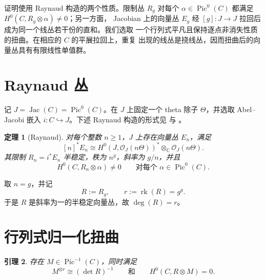 \documentclass[UTF8,10pt,a4paper]{ctexart}
\newtheorem{theorem}{定理}[section]
\newtheorem{lemma}[theorem]{引理}
\theoremstyle{remark}
\newcommand{\CC}{\mathbb{C}}
\newcommand{\OO}{\mathcal{O}}
\newcommand{\tens}{\otimes}
\DeclareMathOperator{\Pic}{Pic}
\DeclareMathOperator{\Jac}{Jac}
\DeclareMathOperator{\rk}{rk}
\begin{document}
证明使用 Raynaud 构造的两个性质。限制丛 $R_g$ 对每个
$\alpha\in\Pic^0(C)$ 都满足 $H^0(C,R_g\tens\alpha)\neq0$；另一方面，
Jacobian 上的向量丛 $E_g$ 经 $[g]\colon J\to J$ 拉回后成为同一个线丛若干份的直和。我们选取
一个行列式平凡且保持逐点非消失性质的扭曲。在相应的 $C$ 的平展拉回上，重复
出现的线丛是挠线丛，因而扭曲后的向量丛具有有限线性单值群。

\section{Raynaud 丛}

记 $J=\Jac(C)=\Pic^0(C)$。在 $J$ 上固定一个 theta 除子 $\Theta$，并选取
Abel--Jacobi 嵌入 $i\colon C\hookrightarrow J$。下述 Raynaud 构造的形式见
\cite[Section~3]{Raynaud} 与 \cite[Section~2.3]{Beauville}。

\begin{theorem}[Raynaud]\label{thm:raynaud-zh}
对每个整数 $n\geq1$，$J$ 上存在向量丛 $E_n$，满足
\begin{equation}\label{eq:raynaud-pullback-zh}
  [n]^*E_n
  \cong H^0\!\left(J,\OO_J(n\Theta)\right)^*\tens_{\CC}\OO_J(n\Theta).
\end{equation}
其限制 $R_n=i^*E_n$ 半稳定，秩为 $n^g$，斜率为 $g/n$，并且
\begin{equation}\label{eq:raynaud-nonvanishing-zh}
  H^0(C,R_n\tens\alpha)\neq0
  \qquad\text{对每个 }\alpha\in\Pic^0(C).
\end{equation}
\end{theorem}

取 $n=g$，并记
\[
  R:=R_g,
  \qquad
  r:=\rk(R)=g^g.
\]
于是 $R$ 是斜率为一的半稳定向量丛，故 $\deg(R)=r$。

\section{行列式归一化扭曲}

\begin{lemma}\label{lem:twist-zh}
存在 $M\in\Pic^{-1}(C)$，同时满足
\begin{equation}\label{eq:choice-M-zh}
  M^{\tens r}\cong(\det R)^{-1}
  \qquad\text{和}\qquad
  H^0(C,R\tens M)=0.
\end{equation}
\end{lemma}
\end{document}
